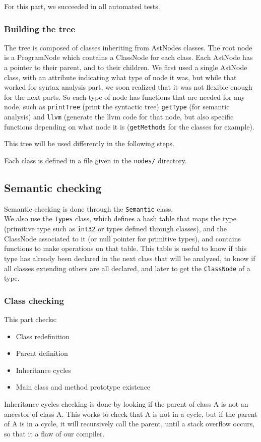 \documentclass[a4paper,11pt]{article}
\begin{document}
  For this part, we succeeded in all automated tests.

  \subsubsection{Building the tree}
    \label{sec:tree}
    The tree is composed of classes inheriting from AstNodes classes. The root node is a ProgramNode which contains a ClassNode for each class. 
	Each AstNode has a pointer to their parent, and to their children. We first used a single AstNode class, with an attribute indicating what type of node it was, but while that worked for syntax analysis part, we soon realized that it was not flexible enough for the next parts. So each type of node has functions that are needed for any node, such as \texttt{printTree} (print the syntactic tree) \texttt{getType} (for semantic analysis) and \texttt{llvm} (generate the llvm code for that node, but also specific functions depending on what node it is (\texttt{getMethods} for the classes for example).

    This tree will be used differently in the following steps.

    Each class is defined in a file given in the \texttt{nodes/} directory.


\subsection{Semantic checking}
  \label{sec:semantic}
  Semantic checking is done through the \texttt{Semantic} class.\\
  We also use the \texttt{Types} class, which defines a hash table that maps the type (primitive type such as \texttt{int32} or types defined through classes), and the ClassNode associated to it (or null pointer for primitive types), and contains functions to make operations on that table.
	This table is useful to know if this type has already been declared in the next class that will be analyzed, to know if all classes extending others are all declared, and later to get the \texttt{ClassNode} of a type.

  \subsubsection{Class checking}
  	This part checks:
    \begin{itemize}
    \item Class redefinition
    \item Parent definition
    \item Inheritance cycles
    \item Main class and method prototype existence
    \end{itemize}
	Inheritance cycles checking is done by looking if the parent of class A is not an ancestor of class A. This works to check that A is not in a cycle, but if the parent of A is in a cycle, it will recursively call the parent, until a stack overflow occurs, so that it a flaw of our compiler.
\end{document}
